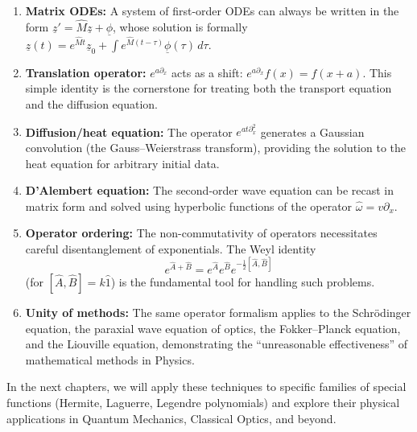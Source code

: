 \begin{enumerate}
\item \textbf{Matrix ODEs:} A system of first-order ODEs can always be written in the form $\underline{z}'=\hat{M}\underline{z}+\underline{\phi}$, whose solution is formally $\underline{z}(t)=e^{\hat{M}t}\underline{z}_{0}+\int e^{\hat{M}(t-\tau)}\underline{\phi}(\tau)\,d\tau$.

\item \textbf{Translation operator:} $e^{a\partial_{x}}$ acts as a shift: $e^{a\partial_{x}}f(x)=f(x+a)$. This simple identity is the cornerstone for treating both the transport equation and the diffusion equation.

\item \textbf{Diffusion/heat equation:} The operator $e^{a t\partial_{x}^{2}}$ generates a Gaussian convolution (the Gauss--Weierstrass transform), providing the solution to the heat equation for arbitrary initial data.

\item \textbf{D'Alembert equation:} The second-order wave equation can be recast in matrix form and solved using hyperbolic functions of the operator $\hat{\omega}=v\partial_{x}$.

\item \textbf{Operator ordering:} The non-commutativity of operators necessitates careful disentanglement of exponentials. The Weyl identity
\[
e^{\hat{A}+\hat{B}}=e^{\hat{A}}e^{\hat{B}}e^{-\frac{1}{2}[\hat{A},\hat{B}]}
\]
(for $[\hat{A},\hat{B}]=k\hat{1}$) is the fundamental tool for handling such problems.

\item \textbf{Unity of methods:} The same operator formalism applies to the Schr\"odinger equation, the paraxial wave equation of optics, the Fokker--Planck equation, and the Liouville equation, demonstrating the ``unreasonable effectiveness'' of mathematical methods in Physics.
\end{enumerate}

In the next chapters, we will apply these techniques to specific families of special functions (Hermite, Laguerre, Legendre polynomials) and explore their physical applications in Quantum Mechanics, Classical Optics, and beyond.

